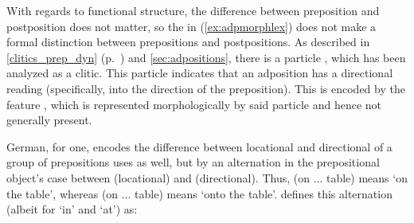 With regards to functional structure, the difference between preposition and
postposition does not matter, so the \Avm{} in (\ref{ex:adpmorphlex}) does not
make a formal distinction between prepositions and postpositions. As described
in \autoref{clitics_prep_dyn} (p.~\pageref{clitics_prep_dyn}) and 
\autoref{sec:adpositions}, there is a particle , which has been
analyzed as a clitic. This particle indicates that an adposition has a
directional reading (specifically, into the direction of the preposition). This
is encoded by the feature \PSem{}, which is represented morphologically by said
particle and hence not generally present.

\begin{morphlex}
\pex\label{ex:adpmorphlex}%
\a{}

\a{}
\xe
\end{morphlex}


German, for one, encodes the difference between locational and directional of a
group of prepositions uses as well, but by an alternation in the prepositional
object's case between \Dat{} (locational) and \Acc{} (directional). Thus,
 (on \Def{}.\Dat{}.\M{}.\Sg{} table) means `on the table',
whereas  (on \Def{}.\Acc{}.\M {}.\Sg{} table) means `onto the
table'. \citet{butt2005} defines this alternation (albeit for  `in' and
 `at') as:


